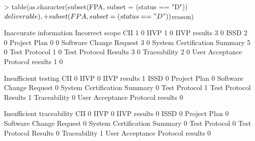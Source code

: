 \documentclass{article}
\begin{document}
\begin{Schunk}
\begin{Sinput}
> table(as.character(subset(FPA, subset = (status == "D"))$deliverable),
+       subset(FPA, subset = (status == "D"))$reason)
\end{Sinput}
\begin{Soutput}
                                   Inaccurate information Incorrect scope
  CII                                                   1               0
  IIVP                                                  1               0
  IIVP results                                          3               0
  ISSD                                                  2               0
  Project Plan                                          0               0
  Software Change Request                               3               0
  System Certification Summary                          5               0
  Test Protocol                                         1               0
  Test Protocol Results                                 3               0
  Traceability                                          2               0
  User Acceptance Protocol results                      1               0
                                  
                                   Insufficient testing
  CII                                                 0
  IIVP                                                0
  IIVP results                                        1
  ISSD                                                0
  Project Plan                                        0
  Software Change Request                             0
  System Certification Summary                        0
  Test Protocol                                       1
  Test Protocol Results                               1
  Traceability                                        0
  User Acceptance Protocol results                    0
                                  
                                   Insufficient traceability
  CII                                                      0
  IIVP                                                     0
  IIVP results                                             0
  ISSD                                                     0
  Project Plan                                             0
  Software Change Request                                  0
  System Certification Summary                             0
  Test Protocol                                            0
  Test Protocol Results                                    0
  Traceability                                             1
  User Acceptance Protocol results                         0
                                  

\end{Soutput}
\end{Schunk}
\end{document}

